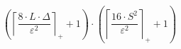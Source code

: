 \[\left(\left\lceil \frac{8 \cdot L \cdot \Delta}{\varepsilon^{2}} \right\rceil_{+} + 1\right) \cdot \left(\left\lceil \frac{16 \cdot S^{2}}{\varepsilon^{2}} \right\rceil_{+} + 1\right)\]
